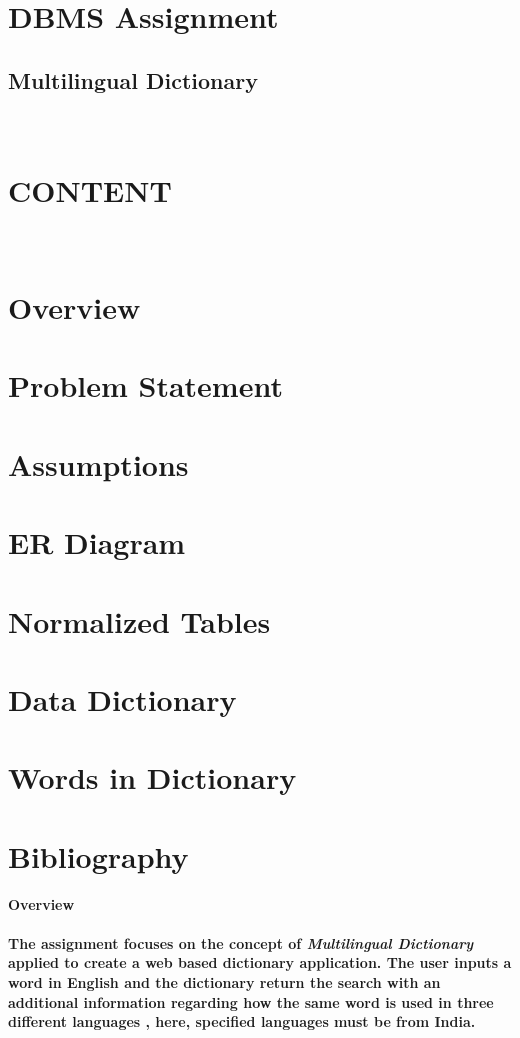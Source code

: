 \documentclass{article}
\begin{document}
\begin{center}
\section*{DBMS Assignment}
\subsection*{Multilingual Dictionary}
 \\
\section*{\huge{CONTENT}}
\end{center}
\\ 
\section{Overview}
\section{Problem Statement}
\section{Assumptions}
\section{ER Diagram}
\section{Normalized Tables}
\section{Data Dictionary}
\section{Words in Dictionary}
\section{Bibliography}

\pagebreak

\huge\textbf{{Overview}} \\
\hline

\paragraph{
The assignment focuses on the concept of \textit\textbf{{Multilingual Dictionary}} applied to create a web based dictionary application. The user inputs a word in English and the dictionary return the search with an additional information regarding how the same word is used in three different languages , here, specified languages must be from India. 
}
\end{document}

